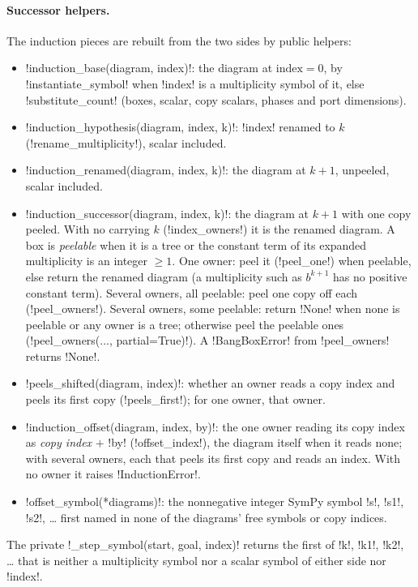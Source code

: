\paragraph{Successor helpers.} The induction pieces are rebuilt from the two sides by public helpers:
\begin{sloppypar}
\begin{itemize}
\item \py!induction_base(diagram, index)!: the diagram at $\text{index}=0$, by \py!instantiate_symbol! when \py!index! is a multiplicity symbol of it, else \py!substitute_count! (boxes, scalar, copy scalars, phases and port dimensions).
\item \py!induction_hypothesis(diagram, index, k)!: \py!index! renamed to $k$ (\py!rename_multiplicity!), scalar included.
\item \py!induction_renamed(diagram, index, k)!: the diagram at $k+1$, unpeeled, scalar included.
\item \py!induction_successor(diagram, index, k)!: the diagram at $k+1$ with one copy peeled. With no \bbox{} carrying $k$ (\py!index_owners!) it is the renamed diagram. A box is \emph{peelable} when it is a tree \bbox{} or the constant term of its expanded multiplicity is an integer $\ge1$. One owner: peel it (\py!peel_one!) when peelable, else return the renamed diagram (a multiplicity such as $b^{k+1}$ has no positive constant term). Several owners, all peelable: peel one copy off each (\py!peel_owners!). Several owners, some peelable: return \py!None! when none is peelable or any owner is a tree; otherwise peel the peelable ones (\py!peel_owners(..., partial=True)!). A \py!BangBoxError! from \py!peel_owners! returns \py!None!.
\item \py!peels_shifted(diagram, index)!: whether an owner reads a copy index and peels its first copy (\py!peels_first!); for one owner, that owner.
\item \py!induction_offset(diagram, index, by)!: the one owner reading its copy index as \emph{copy index} $+$ \py!by! (\py!offset_index!), the diagram itself when it reads none; with several owners, each that peels its first copy and reads an index. With no owner it raises \py!InductionError!.
\item \py!offset_symbol(*diagrams)!: the nonnegative integer SymPy symbol \code!s!, \code!s1!, \code!s2!, \ldots{} first named in none of the diagrams' free symbols or copy indices.
\end{itemize}
\end{sloppypar}
The private \py!_step_symbol(start, goal, index)! returns the first of \code!k!, \code!k1!, \code!k2!, \ldots{} that is neither a multiplicity symbol nor a scalar symbol of either side nor \py!index!.

